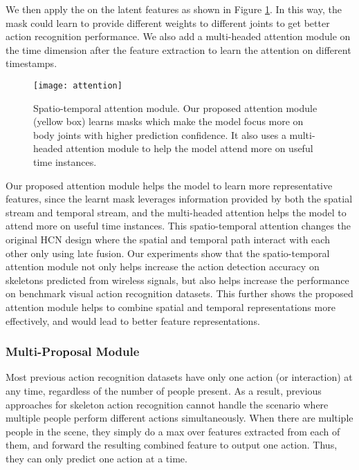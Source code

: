 \documentclass[10pt,twocolumn,letterpaper]{article}
\begin{document}
We then apply the  on the latent features as shown in Figure \ref{fig:attention}.  In this way, the mask could learn to provide different weights to different joints to get better action recognition performance. We also add a multi-headed attention module \cite{vaswani2017attention} on the time dimension after the feature extraction to learn the attention on different timestamps.
\begin{figure}[t]
\centering
\texttt{[image: attention]}
\caption{\footnotesize{Spatio-temporal attention module. Our proposed attention module (yellow box) learns masks which make the model focus more on body joints with higher prediction confidence. It also uses a multi-headed attention module to help the model attend more on useful time instances.}}    \label{fig:attention}
\vspace{-5pt}
\end{figure}

Our proposed attention module helps the model to learn more representative features, since the learnt mask leverages information provided by both the spatial stream and temporal stream, and the multi-headed attention helps the model to attend more on useful time instances. This spatio-temporal attention changes the original HCN design where the spatial and temporal path interact with each other only using late fusion. Our experiments show that the spatio-temporal attention module not only helps increase the action detection accuracy on skeletons predicted from wireless signals, but also helps increase the performance on benchmark visual action recognition datasets. This further shows the proposed attention module helps to combine spatial and temporal representations more effectively, and would lead to better feature representations.

\subsubsection{Multi-Proposal Module}\label{sec:multi-proposal}
Most previous action recognition datasets have only one action (or interaction) at any time, regardless of the number of people present. As a result, previous approaches for skeleton action recognition cannot handle the scenario where multiple people perform different actions simultaneously. When there are multiple people in the scene, they simply do a max over features extracted from each of them, and forward the resulting combined feature to output one action. Thus, they can only predict one action at a time. 
\end{document}
